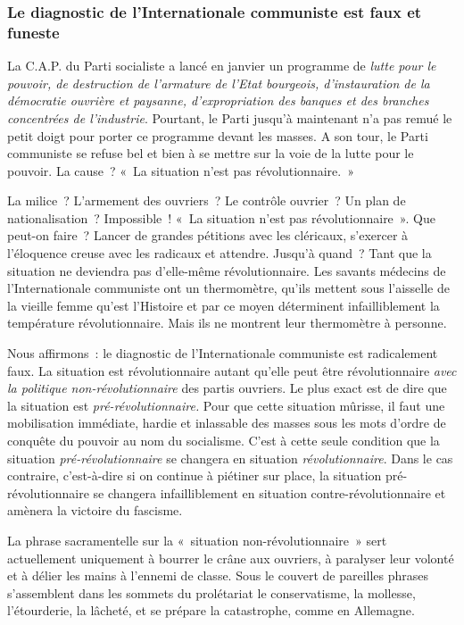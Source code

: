 \documentclass[french,twoside]{book} %
\begin{document}
\subsubsection[{Le diagnostic de l’Internationale communiste est faux et funeste}]{Le diagnostic de l’Internationale communiste est faux et funeste}
\noindent La C.A.P. du Parti socialiste a lancé en janvier un programme de \emph{lutte pour le pouvoir, de destruction de l’armature de l’Etat bourgeois, d’instauration de la démocratie ouvrière et paysanne, d’expropriation des banques et des branches concentrées de l’industrie}. Pourtant, le Parti jusqu’à maintenant n’a pas remué le petit doigt pour porter ce programme devant les masses. A son tour, le Parti communiste se refuse bel et bien à se mettre sur la voie de la lutte pour le pouvoir. La cause ? « La situation n’est pas révolutionnaire. »\par
 La milice ? L’armement des ouvriers ? Le contrôle ouvrier ? Un plan de nationalisation ? Impossible ! « La situation n’est pas révolutionnaire ». Que peut-on faire ? Lancer de grandes pétitions avec les cléricaux, s’exercer à l’éloquence creuse avec les radicaux et attendre. Jusqu’à quand ? Tant que la situation ne deviendra pas d’elle-même révolutionnaire. Les savants médecins de l’Internationale communiste ont un thermomètre, qu’ils mettent sous l’aisselle de la vieille femme qu’est l’Histoire et par ce moyen déterminent infailliblement la température révolutionnaire. Mais ils ne montrent leur thermomètre à personne.\par
Nous affirmons : le diagnostic de l’Internationale communiste est radicalement faux. La situation est révolutionnaire autant qu’elle peut être révolutionnaire \emph{avec la politique non-révolutionnaire} des partis ouvriers. Le plus exact est de dire que la situation est \emph{pré-révolutionnaire.} Pour que cette situation mûrisse, il faut une mobilisation immédiate, hardie et inlassable des masses sous les mots d’ordre de conquête du pouvoir au nom du socialisme. C’est à cette seule condition que la situation \emph{pré-révolutionnaire} se changera en situation \emph{révolutionnaire}. Dans le cas contraire, c’est-à-dire si on continue à piétiner sur place, la situation pré-révolutionnaire se changera infailliblement en situation contre-révolutionnaire et amènera la victoire du fascisme.\par
La phrase sacramentelle sur la « situation non-révolutionnaire » sert actuellement uniquement à bourrer le crâne aux ouvriers, à paralyser leur volonté et à délier les mains à l’ennemi de classe. Sous le couvert de pareilles phrases s’assemblent dans les sommets du prolétariat le conservatisme, la mollesse, l’étourderie, la lâcheté, et se prépare la catastrophe, comme en Allemagne.
\end{document}
